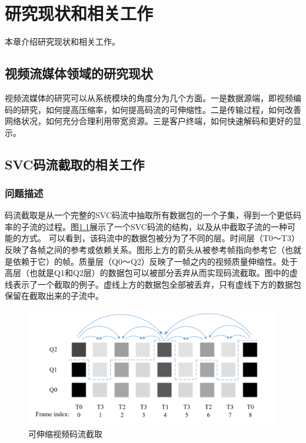 \chapter{研究现状和相关工作}
本章介绍研究现状和相关工作。

\section{视频流媒体领域的研究现状}

视频流媒体的研究可以从系统模块的角度分为几个方面。一是数据源端，即视频编码的研究，如何提高压缩率，如何提高码流的可伸缩性。二是传输过程，如何改善网络状况，如何充分合理利用带宽资源。三是客户终端，如何快速解码和更好的显示。

\section{SVC码流截取的相关工作}

\subsection{问题描述}

码流截取是从一个完整的SVC码流中抽取所有数据包的一个子集，得到一个更低码率的子流的过程。图\ref{fig:Bitstream-Extraction}展示了一个SVC码流的结构，以及从中截取子流的一种可能的方式。
可以看到，该码流中的数据包被分为了不同的层。时间层（T0～T3）反映了各帧之间的参考或依赖关系。图形上方的箭头从被参考帧指向参考它（也就是依赖于它）的帧。质量层（Q0～Q2）反映了一帧之内的视频质量伸缩性。处于高层（也就是Q1和Q2层）的数据包可以被部分丢弃从而实现码流截取。图中的虚线表示了一个截取的例子。虚线上方的数据包全部被丢弃，只有虚线下方的数据包保留在截取出来的子流中。

\begin{figure}[h]
\centering
\includegraphics[width = 0.9\linewidth]{./figures/Bitstream-Extraction.jpg}
\caption{可伸缩视频码流截取 \label{fig:Bitstream-Extraction}}
\end{figure}

